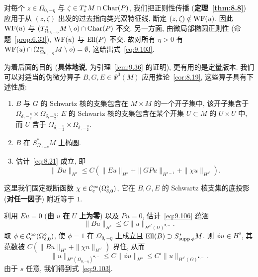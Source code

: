 对每个 $z \in \Omega_{0,-\eta}$ 与 $\zeta \in T_z^* M \cap \operatorname{Char}(P)$, 我们把正则性传播 (\textbf{定理~\ref{thm:8.8}}) 应用于从 $(z, \zeta)$ 出发的过去指向类光双特征线, 断定 $(z, \zeta) \notin \operatorname{WF}(u)$. 因此 $\operatorname{WF}(u)$ 与 $(T_{\Omega_{0,-\eta}}^* M \setminus o) \cap \operatorname{Char}(P)$ 不交. 另一方面, 由微局部椭圆正则性 (命题~\ref{prop:6.33}), $\operatorname{WF}(u)$ 与 $\operatorname{Ell}(P)$ 不交. 故对所有 $\eta > 0$ 有 $\operatorname{WF}(u) \cap (T_{\Omega_{0,-\eta}}^* M \setminus o) = \emptyset$, 这给出式~\eqref{eq:9.103}.

为着后面的目的 (\textbf{具体地说}, 为引理~\ref{lem:9.36} 的证明), 更有用的是定量版本. 我们可以对适当的伪微分算子 $B, G, E \in \Psi^0(M)$ 应用推论~\ref{cor:8.19}, 这些算子具有下述性质:
\begin{enumerate}
    \item $B$ 与 $G$ 的 Schwartz 核的支集包含在 $M \times M$ 的一个开子集中, 该开子集含于 $\Omega_{\delta,-\frac{\eta}{2}} \times \Omega_{\delta,-\frac{\eta}{2}}$; $E$ 的 Schwartz 核的支集包含在某个开集 $U \subset M$ 的 $U \times U$ 中, 而 $U$ 含于 $\Omega_{\delta,-\frac{\eta}{2}} \times \Omega_{\delta,-\frac{\eta}{2}}$.
    \item $B$ 在 $S_{\Omega_{0,-\eta}}^* M$ 上椭圆.
    \item 估计~\eqref{eq:8.21} 成立, 即
    \begin{equation}\label{eq:9.106}
        \|B u\|_{H^s} \le C \left( \|E u\|_{H^s} + \|G P u\|_{H^{s-1}} + \|\chi u\|_{H^{s'}} \right).
    \end{equation}
\end{enumerate}
这里我们固定截断函数 $\chi \in \mathcal{C}_{\mathrm{c}}^\infty(\Omega_{\delta,0}^\circ)$, 它在 $B, G, E$ 的 Schwartz 核支集的底投影 (\textbf{对任一因子}) 附近等于 $1$.

利用 $E u = 0$ (\textbf{由} $u$ \textbf{在} $U$ \textbf{上为零}) 以及 $P u = 0$, 估计~\eqref{eq:9.106} 蕴涵
\begin{equation}\label{eq:9.107}
    \|B u\|_{H^s} \le C \|u\|_{H^{s'}(\Omega)^{\bullet,-}}.
\end{equation}
取 $\phi \in \mathcal{C}_{\mathrm{c}}^\infty(\Omega_{\delta,0}^\circ)$, 使 $\phi = 1$ 在 $\Omega_{0,-\eta}$ 上成立且 $\operatorname{Ell}(B) \supset S_{\operatorname{supp}\phi}^* M$. 则 $\phi u \in H^s$, 其范数被 $C(\|B u\|_{H^s} + \|\chi u\|_{H^{s'}})$ 界住, 从而
\begin{equation}\label{eq:9.108}
    \|u\|_{H^s(\Omega_{0,-\eta})^{\bullet,-}} \le C \|\phi u\|_{H^s} \le C' \|u\|_{H^{s'}(\Omega)^{\bullet,-}}.
\end{equation}
由于 $s$ 任意, 我们得到式~\eqref{eq:9.103}.

